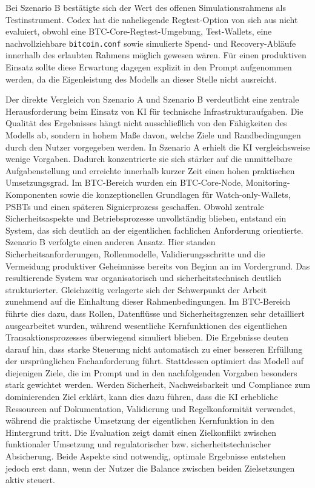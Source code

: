 Bei Szenario B bestätigte sich der Wert des offenen Simulationsrahmens als Testinstrument. Codex hat die naheliegende Regtest-Option von sich aus nicht evaluiert, obwohl eine \ac{BTC}-Core-Regtest-Umgebung, Test-Wallets, eine nachvollziehbare \texttt{bitcoin.conf} sowie simulierte Spend- und Recovery-Abläufe innerhalb des erlaubten Rahmens möglich gewesen wären. 
Für einen produktiven Einsatz sollte diese Erwartung dagegen explizit in den Prompt aufgenommen werden, da die Eigenleistung des Modells an dieser Stelle nicht ausreicht.

Der direkte Vergleich von Szenario A und Szenario B verdeutlicht eine zentrale Herausforderung beim Einsatz von \ac{KI} für technische Infrastrukturaufgaben. Die Qualität des Ergebnisses hängt nicht ausschließlich von den Fähigkeiten des Modells ab, sondern in hohem Maße davon, welche Ziele und Randbedingungen durch den Nutzer vorgegeben werden. In Szenario A erhielt die \ac{KI} vergleichsweise wenige Vorgaben. Dadurch konzentrierte sie sich stärker auf die unmittelbare Aufgabenstellung und erreichte innerhalb kurzer Zeit einen hohen praktischen Umsetzungsgrad. Im \ac{BTC}-Bereich wurden ein \ac{BTC}-Core-Node, Monitoring-Komponenten sowie die konzeptionellen Grundlagen für Watch-only-Wallets, \acp{PSBT} und einen späteren Signierprozess geschaffen. Obwohl zentrale Sicherheitsaspekte und Betriebsprozesse unvollständig blieben, entstand ein System, das sich deutlich an der eigentlichen fachlichen Anforderung orientierte. Szenario B verfolgte einen anderen Ansatz. Hier standen Sicherheitsanforderungen, Rollenmodelle, Validierungsschritte und die Vermeidung produktiver Geheimnisse bereits von Beginn an im Vordergrund. Das resultierende System war organisatorisch und sicherheitstechnisch deutlich strukturierter. Gleichzeitig verlagerte sich der Schwerpunkt der Arbeit zunehmend auf die Einhaltung dieser Rahmenbedingungen. Im \ac{BTC}-Bereich führte dies dazu, dass Rollen, Datenflüsse und Sicherheitsgrenzen sehr detailliert ausgearbeitet wurden, während wesentliche Kernfunktionen des eigentlichen Transaktionsprozesses überwiegend simuliert blieben. Die Ergebnisse deuten darauf hin, dass starke Steuerung nicht automatisch zu einer besseren Erfüllung der ursprünglichen Fachanforderung führt. Stattdessen optimiert das Modell auf diejenigen Ziele, die im Prompt und in den nachfolgenden Vorgaben besonders stark gewichtet werden. Werden Sicherheit, Nachweisbarkeit und Compliance zum dominierenden Ziel erklärt, kann dies dazu führen, dass die \ac{KI} erhebliche Ressourcen auf Dokumentation, Validierung und Regelkonformität verwendet, während die praktische Umsetzung der eigentlichen Kernfunktion in den Hintergrund tritt. Die Evaluation zeigt damit einen Zielkonflikt zwischen funktionaler Umsetzung und regulatorischer bzw. sicherheitstechnischer Absicherung. Beide Aspekte sind notwendig, optimale Ergebnisse entstehen jedoch erst dann, wenn der Nutzer die Balance zwischen beiden Zielsetzungen aktiv steuert.

